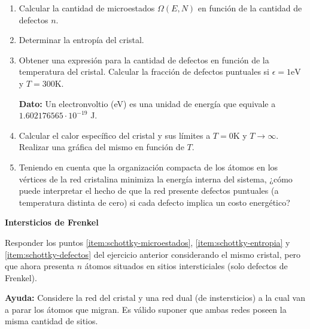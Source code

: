 \documentclass[a4paper,11pt]{article}
\begin{document}
\begin{enumerate}[label=(\alph*),
                  leftmargin=2\parindent,
                  rightmargin=2\parindent]

    \item{\label{item:schottky-microestados}
          Calcular la cantidad de microestados $\Omega(E, N)$ en 
          función de la cantidad de defectos $n$.
          }

    \item{\label{item:schottky-entropia}
          Determinar la entropía del cristal.}
    
    \item{\label{item:schottky-defectos}
          Obtener una expresión para la cantidad de defectos en 
          función de la temperatura del cristal.
          Calcular la fracción de defectos puntuales si
          $\epsilon = 1 \text{eV}$ y $T = 300 \text{K}$.
          }

    {\small
    \textbf{Dato:}
    Un electronvoltio (eV) es una unidad de energía que equivale a 
    $1.602176565 \cdot 10^{-19}$ J.
    }
    
    \item{\label{item:schottky-cv}
          Calcular el calor específico del cristal y sus límites
          a $T = 0 \text{K}$ y $T \rightarrow \infty$.
          Realizar una gráfica del mismo en función de $T$.
          }

    \item{Teniendo en cuenta que la organización compacta de los átomos 
          en los vértices de la red cristalina minimiza la energía 
          interna del sistema, ¿cómo puede interpretar el hecho de que 
          la red presente defectos puntuales (a temperatura distinta de 
          cero) si cada defecto implica un costo energético?
          }

\end{enumerate}


\textbf{Intersticios de Frenkel}
\vspace{0.5em}

Responder los puntos \ref{item:schottky-microestados}, 
\ref{item:schottky-entropia} y \ref{item:schottky-defectos} del 
ejercicio anterior considerando el mismo cristal, pero que ahora 
presenta $n$ átomos situados en sitios intersticiales (solo defectos de 
Frenkel).

\vspace{0.5em}
{\small
\textbf{Ayuda:} Considere la red del cristal y una red dual (de 
instersticios) a la cual van a parar los átomos que migran. Es válido 
suponer que ambas redes poseen la misma cantidad de sitios.
}
\end{document}
